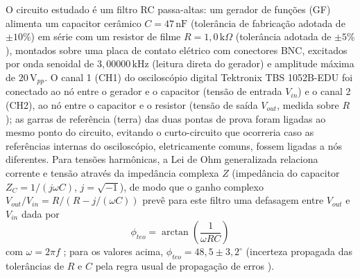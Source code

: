 \documentclass[reprint,amsmath,amssymb,aps,prl,floatfix,onecolumn]{revtex4-2}
\begin{document}
O circuito estudado é um filtro RC passa-altas: um gerador de funções (GF) alimenta um capacitor cerâmico $C=47\,\text{nF}$ (tolerância de fabricação adotada de $\pm10\%$) em série com um resistor de filme $R=1{,}0\,\text{k}\Omega$ (tolerância adotada de $\pm5\%$), montados sobre uma placa de contato elétrico com conectores BNC, excitados por onda senoidal de $3{,}00000\,\text{kHz}$ (leitura direta do gerador) e amplitude máxima de $20\,\text{V}_{pp}$. O canal 1 (CH1) do osciloscópio digital Tektronix TBS 1052B-EDU foi conectado ao nó entre o gerador e o capacitor (tensão de entrada $V_{in}$) e o canal 2 (CH2), ao nó entre o capacitor e o resistor (tensão de saída $V_{out}$, medida sobre $R$); as garras de referência (terra) das duas pontas de prova foram ligadas ao mesmo ponto do circuito, evitando o curto-circuito que ocorreria caso as referências internas do osciloscópio, eletricamente comuns, fossem ligadas a nós diferentes. Para tensões harmônicas, a Lei de Ohm generalizada relaciona corrente e tensão através da impedância complexa $Z$ (impedância do capacitor $Z_C=1/(j\omega C)$, $j=\sqrt{-1}$), de modo que o ganho complexo $V_{out}/V_{in}=R/(R-j/(\omega C))$ prevê para este filtro uma defasagem entre $V_{out}$ e $V_{in}$ dada por
\begin{equation}
	\label{eq:fase_teorica}
	\phi_{teo}=\arctan\!\left(\frac{1}{\omega R C}\right)
\end{equation}
com $\omega=2\pi f$ \cite{Halliday2013}; para os valores acima, $\phi_{teo}=48{,}5\pm3{,}2^\circ$ (incerteza propagada das tolerâncias de $R$ e $C$ pela regra usual de propagação de erros \cite{Vuolo1996}).
\end{document}

